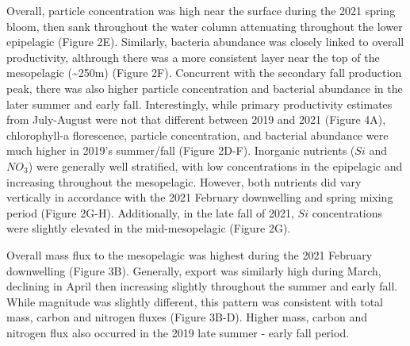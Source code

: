 \documentclass[
]{article}
\begin{document}
Overall, particle concentration was high near the surface during the
2021 spring bloom, then sank throughout the water column attenuating
throughout the lower epipelagic (Figure 2E). Similarly, bacteria
abundance was closely linked to overall productivity, althrough there
was a more consistent layer near the top of the mesopelagic
(\textasciitilde250m) (Figure 2F). Concurrent with the secondary fall
production peak, there was also higher particle concentration and
bacterial abundance in the later summer and early fall. Interestingly,
while primary productivity estimates from July-August were not that
different between 2019 and 2021 (Figure 4A), chlorophyll-a florescence,
particle concentration, and bacterial abundance were much higher in
2019's summer/fall (Figure 2D-F). Inorganic nutrients (\(Si\) and
\(NO_3\)) were generally well stratified, with low concentrations in the
epipelagic and increasing throughout the mesopelagic. However, both
nutrients did vary vertically in accordance with the 2021 February
downwelling and spring mixing period (Figure 2G-H). Additionally, in the
late fall of 2021, \(Si\) concentrations were slightly elevated in the
mid-mesopelagic (Figure 2G).

Overall mass flux to the mesopelagic was highest during the 2021
February downwelling (Figure 3B). Generally, export was similarly high
during March, declining in April then increasing slightly throughout the
summer and early fall. While magnitude was slightly different, this
pattern was consistent with total mass, carbon and nitrogen fluxes
(Figure 3B-D). Higher mass, carbon and nitrogen flux also occurred in
the 2019 late summer - early fall period.
\end{document}
